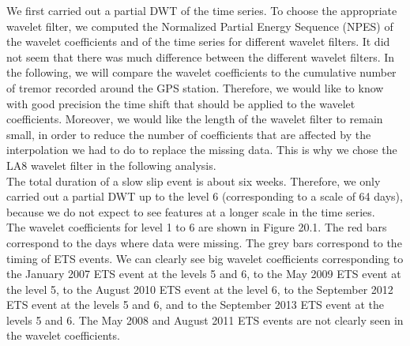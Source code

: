 \documentclass[main.tex]{subfiles}
\begin{document}
We first carried out a partial DWT of the time series. To choose the appropriate wavelet filter, we computed the Normalized Partial Energy Sequence (NPES) of the wavelet coefficients and of the time series for different wavelet filters. It did not seem that there was much difference between the different wavelet filters. In the following, we will compare the wavelet coefficients to the cumulative number of tremor recorded around the GPS station. Therefore, we would like to know with good precision the time shift that should be applied to the wavelet coefficients. Moreover, we would like the length of the wavelet filter to remain small, in order to reduce the number of coefficients that are affected by the interpolation we had to do to replace the missing data. This is why we chose the LA8 wavelet filter in the following analysis. \\

The total duration of a slow slip event is about six weeks. Therefore, we only carried out a partial DWT up to the level 6 (corresponding to a scale of 64 days), because we do not expect to see features at a longer scale in the time series. \\

The wavelet coefficients for level 1 to 6 are shown in Figure 20.1. The red bars correspond to the days where data were missing. The grey bars correspond to the timing of ETS events.  We can clearly see big wavelet coefficients corresponding to the January 2007 ETS event at the levels 5 and 6, to the May 2009 ETS event at the level 5, to the August 2010 ETS event at the level 6, to the September 2012 ETS event at the levels 5 and 6, and to the September 2013 ETS event at the levels 5 and 6.  The May 2008 and August 2011 ETS events are not clearly seen in the wavelet coefficients. \\
\end{document}
